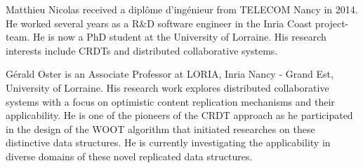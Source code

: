 \documentclass[10pt,journal,compsoc]{IEEEtran}
\begin{document}





%

\begin{IEEEbiography}{Matthieu Nicolas}
    received a diplôme d'ingénieur from TELECOM Nancy in 2014.
    He worked several years as a R\&D software engineer in the Inria Coast project-team.
    He is now a PhD student at the University of Lorraine.
    His research interests include \acfp{CRDT} and distributed collaborative systems.
\end{IEEEbiography}

\begin{IEEEbiography}{Gérald Oster}
    is an Associate Professor at LORIA, Inria Nancy - Grand Est, University of Lorraine.
    His research work explores distributed collaborative systems with a focus on optimistic content replication mechanisms and their applicability.
    He is one of the pioneers of the CRDT approach as he participated in the design of the WOOT algorithm that initiated researches on these distinctive data structures.
    He is currently investigating the applicability in diverse domains of these novel replicated data structures.
\end{IEEEbiography}
\end{document}
